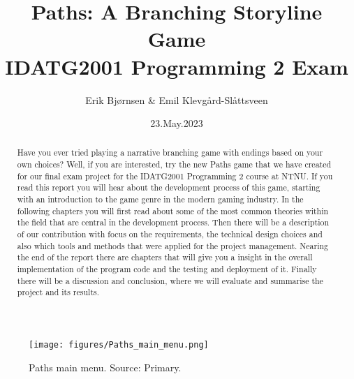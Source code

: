 \documentclass[British]{article}
\title{Paths: A Branching Storyline Game \\
\large IDATG2001 Programming 2 Exam}
\author{Erik Bjørnsen \& Emil Klevgård-Slåttsveen}
\date{23.May.2023}
\begin{document}
\maketitle

\begin{figure}[h]
  \centering
  \texttt{[image: figures/Paths\_main\_menu.png]}
  \caption{Paths main menu. Source: Primary.}
\end{figure}

\newpage 
\tableofcontents

\newpage 


\begin{abstract}
    Have you ever tried playing a narrative branching game with endings based on your own choices? Well, if you are interested, try the new Paths game that we have created for our final exam project for the IDATG2001 Programming 2 course at NTNU. If you read this report you will hear about the development process of this game, starting with an introduction to the game genre in the modern gaming industry. In the following chapters you will first read about some of the most common theories within the field that are central in the development process. Then there will be a description of our contribution with focus on the requirements, the technical design choices and also which tools and methods that were applied for the project management. Nearing the end of the report there are chapters that will give you a insight in the overall implementation of the program code and the testing and deployment of it. Finally there will be a discussion and conclusion, where we will evaluate and summarise the project and its results. 
\end{abstract}
\end{document}
